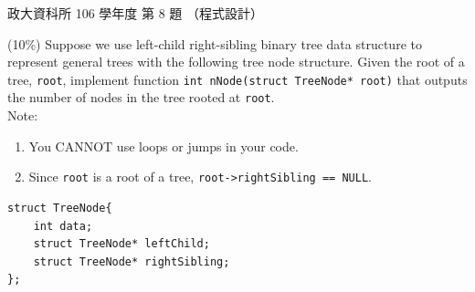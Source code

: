 \begin{pastexam}[label={px:nccu-106-dsa-08}]{政大資科所 106 學年度 第 8 題}
（程式設計）

(10\%) Suppose we use left-child right-sibling binary tree data structure to represent general trees
with the following tree node structure. Given the root of a tree, \texttt{root}, implement function
\texttt{int nNode(struct TreeNode* root)} that outputs the number of nodes in the tree rooted at
\texttt{root}.\\
Note:
\begin{enumerate}[label=\Alph*.,leftmargin=4em]
\item You CANNOT use loops or jumps in your code.
\item Since \texttt{root} is a root of a tree, \texttt{root->rightSibling == NULL}.
\end{enumerate}
\begin{verbatim}
struct TreeNode{
    int data;
    struct TreeNode* leftChild;
    struct TreeNode* rightSibling;
};
\end{verbatim}
\end{pastexam}

